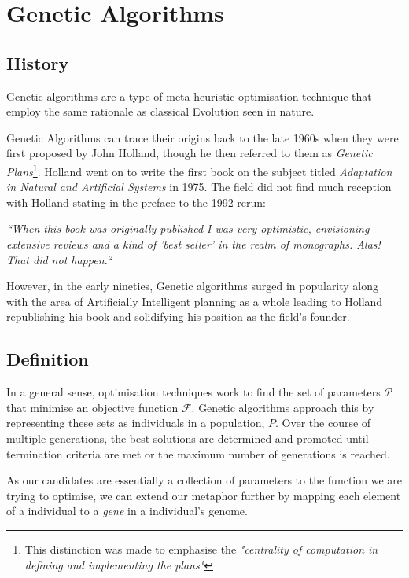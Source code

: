 \section{Genetic Algorithms}

\subsection{History}

Genetic algorithms are a type of meta-heuristic optimisation technique that employ the same rationale as classical Evolution seen in nature.

Genetic Algorithms can trace their origins back to the late 1960s when they were first proposed by John Holland, though he then referred to them as \textit{Genetic Plans}\footnote{This distinction was made to emphasise the \textit{"centrality of computation in defining and implementing the plans"}\cite{hollandAdaptationNaturalArtificial1992a}}. Holland went on to write the first book on the subject titled \textit{Adaptation in Natural and Artificial Systems}\cite{hollandAdaptationNaturalArtificial1992a} in 1975. The field did not find much reception with Holland stating in the preface to the 1992 rerun:

\begin{displayquote}
\textit{``When this book was originally published I was very optimistic, envisioning extensive reviews and a kind of 'best seller' in the realm of monographs. Alas! That did not happen.``}
\end{displayquote}

However, in the early nineties, Genetic algorithms surged in popularity along with the area of Artificially Intelligent planning as a whole leading to Holland republishing his book and solidifying his position as the field's founder.

\subsection{Definition}
In a general sense, optimisation techniques work to find the set of parameters $\mathcal{P}$ that minimise an objective function $\mathcal{F}$. 
Genetic algorithms approach this by representing these sets as individuals in a population, $P$. Over the course of multiple generations, the best solutions are determined and promoted until termination criteria are met or the maximum number of generations is reached.

As our candidates are essentially a collection of parameters to the function we are trying to optimise, we can extend our metaphor further by mapping each element of a individual to a \textit{gene} in a individual's genome. 

